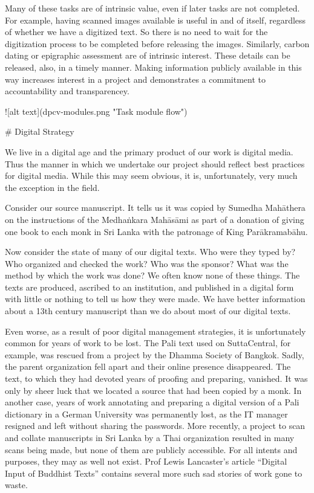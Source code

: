 \documentclass[11pt, openany,a5paper]{article}
\begin{document}
\begin{markdown}
Many of these tasks are of intrinsic value, even if later tasks are not completed. For example, having scanned images available is useful in and of itself, regardless of whether we have a digitized text. So there is no need to wait for the digitization process to be completed before releasing the images. Similarly, carbon dating or epigraphic assessment are of intrinsic interest. These details can be released, also, in a timely manner. Making information publicly available in this way increases interest in a project and demonstrates a commitment to accountability and transparencey.

![alt text](dpcv-modules.png "Task module flow")

# Digital Strategy

We live in a digital age and the primary product of our work is digital media. Thus the manner in which we undertake our project should reflect best practices for digital media. While this may seem obvious, it is, unfortunately, very much the exception in the field.

Consider our source manuscript. It tells us it was copied by Sumedha Mahāthera on the instructions of the Medhaṅkara Mahāsāmi as part of a donation of giving one book to each monk in Sri Lanka with the patronage of King Parākramabāhu.

Now consider the state of many of our digital texts. Who were they typed by? Who organized and checked the work? Who was the sponsor? What was the method by which the work was done? We often know none of these things. The texts are produced, ascribed to an institution, and published in a digital form with little or nothing to tell us how they were made. We have better information about a 13th century manuscript than we do about most of our digital texts.

Even worse, as a result of poor digital management strategies, it is unfortunately common for years of work to be lost. The Pali text used on SuttaCentral, for example, was rescued from a project by the Dhamma Society of Bangkok. Sadly, the parent organization fell apart and their online presence disappeared. The text, to which they had devoted years of proofing and preparing, vanished. It was only by sheer luck that we located a source that had been copied by a monk. In another case, years of work annotating and preparing a digital version of a Pali dictionary in a German University was permanently lost, as the IT manager resigned and left without sharing the passwords. More recently, a project to scan and collate manuscripts in Sri Lanka by a Thai organization resulted in many scans being made, but none of them are publicly accessible. For all intents and purposes, they may as well not exist. Prof Lewis Lancaster’s article “Digital Input of Buddhist Texts” contains several more such sad stories of work gone to waste.


\end{markdown}
\end{document}
